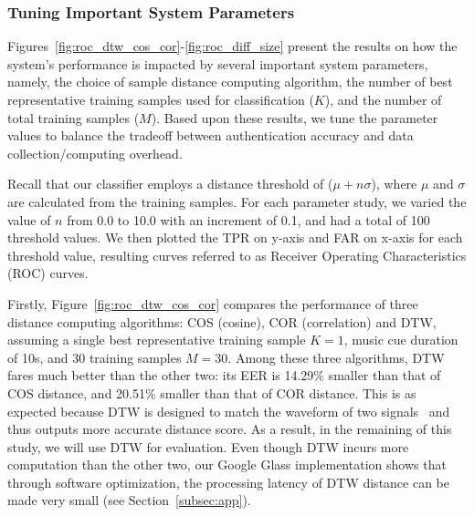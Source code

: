\subsubsection{Tuning Important System Parameters}
Figures~\ref{fig:roc_dtw_cos_cor}-\ref{fig:roc_diff_size} present the results on how the system's performance is impacted by several important system parameters, namely, the choice of sample distance computing algorithm, the number of best representative training samples used for classification ($K$), and the number of total training samples ($M$).
Based upon these results, we tune the parameter values to balance the tradeoff between authentication accuracy and data collection/computing overhead. 

Recall that our classifier employs a distance threshold of ($\mu+n\sigma$), where $\mu$ and $\sigma$ are calculated from the training samples. For each parameter study, we varied the value of $n$ from 0.0 to 10.0 with an increment of 0.1, and had a total of 100 threshold values. We then plotted the TPR  on y-axis and FAR on x-axis for each threshold value,  resulting curves referred to as Receiver Operating Characteristics (ROC) curves. %

Firstly, Figure~\ref{fig:roc_dtw_cos_cor} compares the performance of three distance computing algorithms: COS (cosine), COR (correlation) and DTW, assuming a single best representative training sample $K=1$, music cue duration of 10s, and 30 training samples $M=30$.  Among these three algorithms, DTW fares much better than the other two: its EER is 14.29\% smaller than that of COS distance, and 20.51\% smaller than that of COR distance. This is as expected because DTW is designed to match the waveform of two signals~\cite{dtw} and thus outputs more accurate distance score. As a result, in the remaining of this study, we will use DTW for evaluation. Even though DTW incurs more computation than the other two, our Google Glass implementation shows that through software optimization, the processing latency of DTW distance can be made very small (see Section~\ref{subsec:app}).


